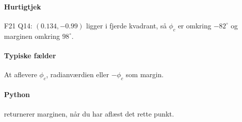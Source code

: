 \paragraph{Hurtigtjek}
F21 Q14: \((0.134,-0.99)\) ligger i fjerde kvadrant, så \(\phi_c\) er omkring
\(-82^\circ\) og marginen omkring \(98^\circ\).

\paragraph{Typiske fælder}
At aflevere \(\phi_c\), radianværdien eller \(-\phi_c\) som margin.

\paragraph{Python}
 returnerer marginen,
når du har aflæst det rette punkt.
